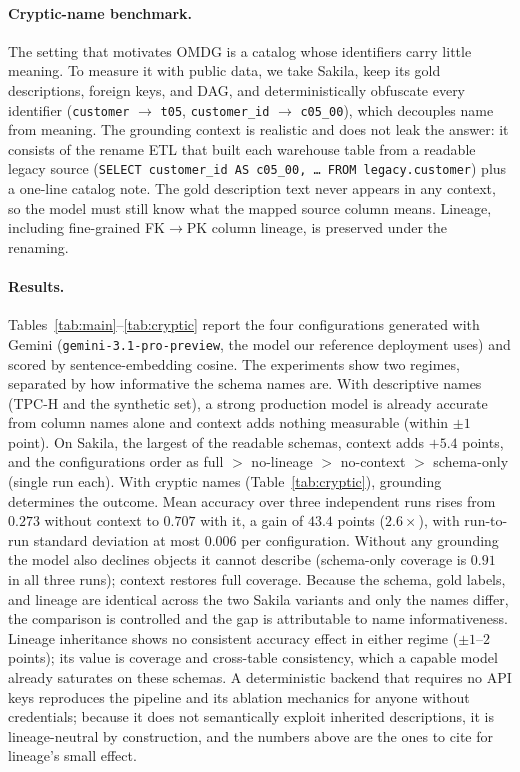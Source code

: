 \paragraph{Cryptic-name benchmark.} The setting that motivates OMDG is a catalog whose
identifiers carry little meaning. To measure it with public data, we take Sakila, keep its
gold descriptions, foreign keys, and DAG, and deterministically obfuscate every identifier
(\texttt{customer} $\to$ \texttt{t05}, \texttt{customer\_id} $\to$ \texttt{c05\_00}), which
decouples name from meaning. The grounding context is realistic and does not leak the
answer: it consists of the rename ETL that built each warehouse table from a readable
legacy source (\texttt{SELECT customer\_id AS c05\_00, \ldots\ FROM legacy.customer}) plus
a one-line catalog note. The gold description text never appears in any context, so the
model must still know what the mapped source column means. Lineage, including fine-grained
FK$\to$PK column lineage, is preserved under the renaming.

\paragraph{Results.} Tables~\ref{tab:main}--\ref{tab:cryptic} report the four
configurations generated with Gemini (\texttt{gemini-3.1-pro-preview}, the model our
reference deployment uses) and scored by sentence-embedding cosine. The experiments show
two regimes, separated by how informative the schema names are.
With descriptive names (TPC-H and the synthetic set), a strong production model is already
accurate from column names alone and context adds nothing measurable (within $\pm1$ point).
On Sakila, the largest of the readable schemas, context adds $+5.4$ points, and the
configurations order as full $>$ no-lineage $>$ no-context $>$ schema-only (single run
each).
With cryptic names (Table~\ref{tab:cryptic}), grounding determines the outcome. Mean
accuracy over three independent runs rises from $0.273$ without context to $0.707$ with it,
a gain of $43.4$ points ($2.6\times$), with run-to-run standard deviation at most $0.006$
per configuration. Without any grounding the model also declines objects it cannot
describe (schema-only coverage is $0.91$ in all three runs); context restores full
coverage. Because the schema, gold labels, and lineage are identical across the two Sakila
variants and only the names differ, the comparison is controlled and the gap is
attributable to name informativeness. Lineage inheritance shows no consistent accuracy
effect in either regime ($\pm1$--$2$ points); its value is coverage and cross-table
consistency, which a capable model already saturates on these schemas.
A deterministic backend that requires no API keys reproduces the pipeline and its ablation
mechanics for anyone without credentials; because it does not semantically exploit
inherited descriptions, it is lineage-neutral by construction, and the numbers above are
the ones to cite for lineage's small effect.

